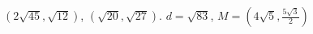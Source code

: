 {$\left(2 \sqrt{45}, \sqrt{12} \right)$, $\left(\sqrt{20}, \sqrt{27} \right)$.}
{$d = \sqrt{83}$, $M = \left(4 \sqrt{5}, \frac{5 \sqrt{3}}{2} \right)$}